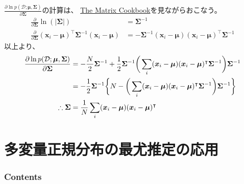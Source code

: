 \documentclass[aspectratio=169,unicode,dvipdfmx,14pt]{beamer}
\begin{document}
\begin{frame}
\FontMath
$\frac{\partial \ln p(\mathcal{D};\bm{\mu},\bm{\Sigma})}{\partial \bm{\Sigma}}$の計算は、
\href{https://www.ics.uci.edu/~welling/teaching/KernelsICS273B/MatrixCookBook.pdf}{The Matrix Cookbook}を見ながらおこなう。
\begin{align}
\frac{\partial}{\partial \bm{\Sigma}}\ln(|\bm{\Sigma}|) & = \bm{\Sigma}^{-1} \\
\frac{\partial}{\partial \bm{\Sigma}}
(\bm{x}_i - \bm{\mu})^\intercal \bm{\Sigma}^{-1} (\bm{x}_i - \bm{\mu})
& = - \bm{\Sigma}^{-1} (\bm{x}_i - \bm{\mu}) (\bm{x}_i - \bm{\mu})^\intercal \bm{\Sigma}^{-1}
\end{align}
以上より、
\begin{align}
\frac{\partial \ln p(\mathcal{D};\bm{\mu},\bm{\Sigma})}{\partial \bm{\Sigma}}
&= - \frac{N}{2}\bm{\Sigma}^{-1}
+ \frac{1}{2} \bm{\Sigma}^{-1}  \bigg( \sum_i
(\bm{x}_i - \bm{\mu}) (\bm{x}_i - \bm{\mu})^\intercal \bm{\Sigma}^{-1} \bigg) \bm{\Sigma}^{-1} \notag \\
&= - \frac{1}{2}\bm{\Sigma}^{-1} \bigg\{
N - \bigg( \sum_i
(\bm{x}_i - \bm{\mu}) (\bm{x}_i - \bm{\mu})^\intercal \bm{\Sigma}^{-1} \bigg) \bm{\Sigma}^{-1} \bigg\} \\
\therefore
\bm{\Sigma} &= \frac{1}{N}\sum_i
(\bm{x}_i - \bm{\mu}) (\bm{x}_i - \bm{\mu})^\intercal 
\end{align}
\end{frame}

\section{多変量正規分布の最尤推定の応用}

\begin{frame}\frametitle{Contents}
\Large \tableofcontents[currentsection]
\end{frame}
\end{document}
